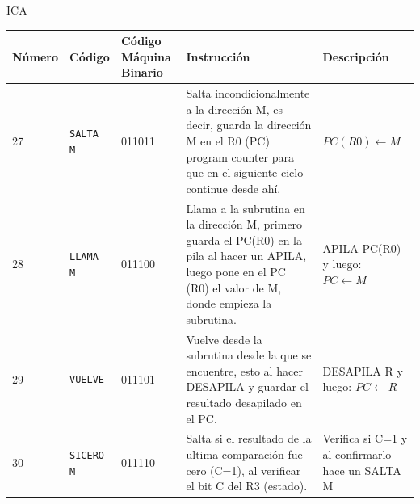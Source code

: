 ICA\documentclass{article}
\begin{document}
\begin{longtable}{|p{}|p{}|p{}|p{}|p{}|}
  \hline
  \textbf{Número}    & \textbf{Código}                                  & \textbf{Código Máquina Binario} & \textbf{Instrucción}                                                                                                                                                                                                          & \textbf{Descripción}                                                                                                   \\
  \hline
  27                 & \texttt{SALTA M}                                 & 011011                          & Salta incondicionalmente a la dirección M, es decir, guarda la dirección M en el R0 (PC) program counter para que en el siguiente ciclo continue desde ahí.                                                                   & $PC(R0) \leftarrow M$                                                                                                  \\
  \hline
  28                 & \texttt{LLAMA M}                                 & 011100                          & Llama a la subrutina en la dirección M, primero guarda el PC(R0) en la pila al hacer un APILA, luego pone en el PC (R0) el valor de M, donde empieza la subrutina.                                                            & APILA PC(R0) y luego: $PC \leftarrow M$                                                                                \\
  \hline
  29                 & \texttt{VUELVE}                                  & 011101                          & Vuelve desde la subrutina desde la que se encuentre, esto al hacer DESAPILA y guardar el resultado desapilado en el PC.                                                                                                       & DESAPILA R y luego: $PC \leftarrow R$                                                                                  \\
  \hline
  30                 & \texttt{SICERO M}                                & 011110                          & Salta si el resultado de la ultima comparación fue cero (C=1), al verificar el bit
  C del R3 (estado). & Verifica si C=1 y al confirmarlo hace un SALTA M                                                                                                                                                                                                                                                                                                                                                                                            \\

\end{longtable}
\end{document}
